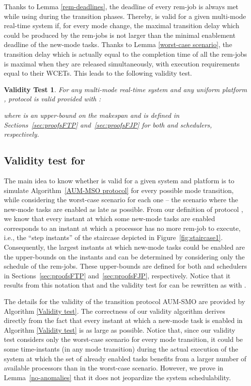 \documentclass[10pt,english,a4paper]{article}
\newtheorem{validity test}{Validity Test}
\begin{document}
Thanks to Lemma \ref{rem-deadlines}, the deadline of every rem-job is always met while using  during the transition phases. Thereby,  is valid for a given multi-mode real-time system if, for every mode change, the maximal transition delay which could be produced by the rem-jobs is not larger than the minimal enablement deadline of the new-mode tasks. Thanks to Lemma \ref{worst-case scenario}, the transition delay which is actually equal to the completion time of all the rem-jobs is maximal when they are released simultaneously, with execution requirements equal to their WCETs. This leads to the following validity test.

\begin{validity test}
For any multi-mode real-time system  and any uniform platform , protocol  is valid provided  with :

\noindent where  is an upper-bound on the makespan and is defined in Sections~\ref{sec:proofsFTP} and~\ref{sec:proofsFJP} for both  and  schedulers, respectively. 
\end{validity test}

\subsection{Validity test for }

The main idea to know whether  is valid for a given system  and platform  is to simulate Algorithm~\ref{AUM-MSO protocol} for every possible mode transition, while considering the worst-case scenario for each one -- the scenario where the new-mode tasks are enabled as late as possible. From our definition of protocol , we know that every instant at which some new-mode tasks are enabled corresponds to an instant at which a processor has no more rem-job to execute, i.e., the ``step instants''  of the staircase depicted in Figure~\ref{fig:staircase1}. Consequently, the largest instants at which new-mode tasks could be enabled are the upper-bounds  on the instants  and can be determined by considering only the schedule of the rem-jobs. These upper-bounds are defined for both  and  schedulers in Sections~\ref{sec:proofsFTP} and~\ref{sec:proofsFJP}, respectively. Notice that it results from this notation that  and the validity test for  can be rewritten as   with . 

The details for the validity of the transition protocol AUM-SMO are provided by Algorithm \ref{Validity test}. The correctness of our validity algorithm derives directly from the fact that every instant at which a new-mode task is enabled in Algorithm \ref{Validity test} is as large as possible. Notice that, since our validity test considers only the worst-case scenario for every mode transition, it could be some time-instants (in any mode transition) during the actual execution of the system at which the set of already enabled tasks benefits from a larger number of available processors than in the worst-case scenario. However, we prove in Lemma~\ref{no-anomalies} that it does not jeopardize the system schedulability.
\end{document}
